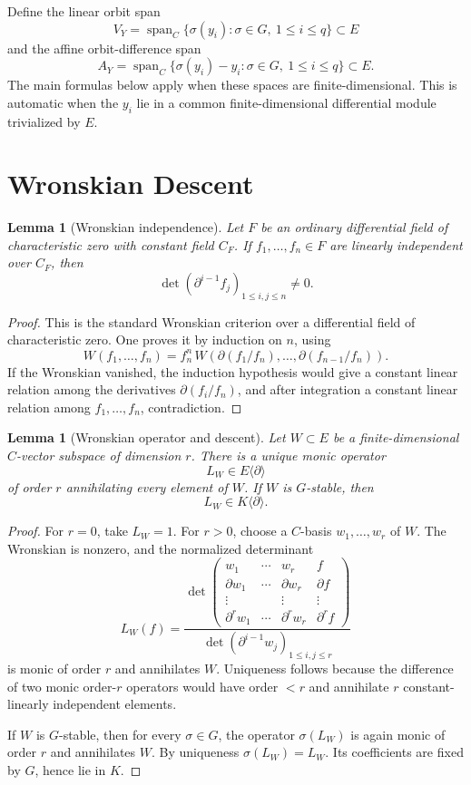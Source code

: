 \documentclass[11pt]{article}
\newtheorem{lemma}[theorem]{Lemma}
\DeclareMathOperator{\Span}{span}
\begin{document}
Define the linear orbit span
\[
V_Y=
\Span_C\{\sigma(y_i):\sigma\in G,\ 1\le i\le q\}\subset E
\]
and the affine orbit-difference span
\[
A_Y=
\Span_C\{\sigma(y_i)-y_i:\sigma\in G,\ 1\le i\le q\}\subset E.
\]
The main formulas below apply when these spaces are finite-dimensional. This is automatic when the \(y_i\) lie in a common finite-dimensional differential module trivialized by \(E\).

\section{Wronskian Descent}

\begin{lemma}[Wronskian independence]
Let \(F\) be an ordinary differential field of characteristic zero with constant field \(C_F\). If \(f_1,\ldots,f_n\in F\) are linearly independent over \(C_F\), then
\[
\det(\partial^{i-1}f_j)_{1\le i,j\le n}\ne0.
\]
\end{lemma}

\begin{proof}
This is the standard Wronskian criterion over a differential field of characteristic zero. One proves it by induction on \(n\), using
\[
W(f_1,\ldots,f_n)
=
f_n^n\,
W\left(
\partial(f_1/f_n),\ldots,\partial(f_{n-1}/f_n)
\right).
\]
If the Wronskian vanished, the induction hypothesis would give a constant linear relation among the derivatives \(\partial(f_i/f_n)\), and after integration a constant linear relation among \(f_1,\ldots,f_n\), contradiction.
\end{proof}

\begin{lemma}[Wronskian operator and descent]
Let \(W\subset E\) be a finite-dimensional \(C\)-vector subspace of dimension \(r\). There is a unique monic operator
\[
L_W\in E\langle\partial\rangle
\]
of order \(r\) annihilating every element of \(W\). If \(W\) is \(G\)-stable, then
\[
L_W\in K\langle\partial\rangle.
\]
\end{lemma}

\begin{proof}
For \(r=0\), take \(L_W=1\). For \(r>0\), choose a \(C\)-basis \(w_1,\ldots,w_r\) of \(W\). The Wronskian is nonzero, and the normalized determinant
\[
L_W(f)=
\frac{
\det
\begin{pmatrix}
w_1 & \cdots & w_r & f\\
\partial w_1 & \cdots & \partial w_r & \partial f\\
\vdots & & \vdots & \vdots\\
\partial^r w_1 & \cdots & \partial^r w_r & \partial^r f
\end{pmatrix}
}{
\det(\partial^{i-1}w_j)_{1\le i,j\le r}
}
\]
is monic of order \(r\) and annihilates \(W\). Uniqueness follows because the difference of two monic order-\(r\) operators would have order \(<r\) and annihilate \(r\) constant-linearly independent elements.

If \(W\) is \(G\)-stable, then for every \(\sigma\in G\), the operator \(\sigma(L_W)\) is again monic of order \(r\) and annihilates \(W\). By uniqueness \(\sigma(L_W)=L_W\). Its coefficients are fixed by \(G\), hence lie in \(K\).
\end{proof}
\end{document}
